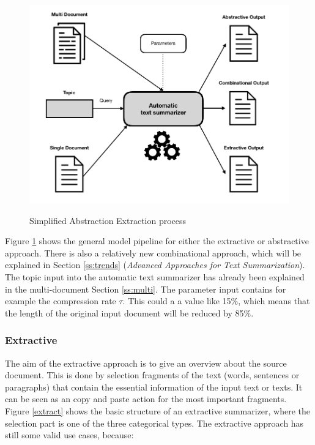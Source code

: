 \begin{figure}
	\begin{center}
		\includegraphics[width=5in]{photos/abex}\\
		\caption{Simplified Abstraction Extraction process}\label{abex}
	\end{center}
\end{figure}

Figure \ref{abex} shows the general model pipeline for either the extractive or abstractive approach. There is also a relatively new combinational approach, which will be explained in Section \ref{ss:trends} (\textit{Advanced Approaches for Text Summarization}). The topic input into the automatic text summarizer has already been explained in the multi-document Section \ref{ss:multi}. The parameter input contains for example the compression rate \(\tau\). This could a a value like 15\%, which means that the length of the original input document will be reduced by 85\%.

\subsubsection{Extractive}
	
The aim of the extractive approach is to give an overview about the source document. This is done by selection fragments of the text (words, sentences or paragraphs) that contain the essential information of the input text or texts. It can be seen as an copy and paste action for the most important fragments. Figure \ref{extract} shows the basic structure of an extractive summarizer, where the selection part is one of the three categorical types. The extractive approach has still some valid use cases, because:

